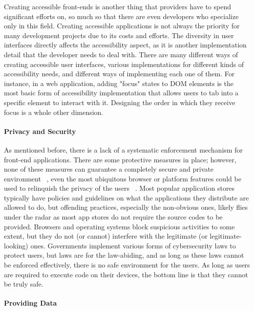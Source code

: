 Creating accessible front-ends is another thing that providers have to spend significant efforts on, so much so that there are even developers who specialize only in this field. Creating accessible applications is not always the priority for many development projects due to its costs and efforts. The diversity in user interfaces directly affects the accessibility aspect, as it is another implementation detail that the developer needs to deal with. There are many different ways of creating accessible user interfaces, various implementations for different kinds of accessibility needs, and different ways of implementing each one of them. For instance, in a web application, adding "focus" states to DOM elements is the most basic form of accessibility implementation that allows users to tab into a specific element to interact with it. Designing the order in which they receive focus is a whole other dimension. 

\paragraph{Privacy and Security}

As mentioned before, there is a lack of a systematic enforcement mechanism for front-end applications. There are some protective measures in place; however, none of these measures can guarantee a completely secure and private environment ~\cite{TrackingWeb}, even the most ubiquitous browser or platform features could be used to relinquish the privacy of the users ~\cite{TrackingFavicon}. Most popular application stores typically have policies and guidelines on what the applications they distribute are allowed to do, but offending practices, especially the non-obvious ones, likely flies under the radar as most app stores do not require the source codes to be provided. Browsers and operating systems block suspicious activities to some extent, but they do not (or cannot) interfere with the legitimate (or legitimate-looking) ones. Governments implement various forms of cybersecurity laws to protect users, but laws are for the law-abiding, and as long as these laws cannot be enforced effectively, there is no safe environment for the users. As long as users are required to execute code on their devices, the bottom line is that they cannot be truly safe.

\paragraph{Providing Data}

